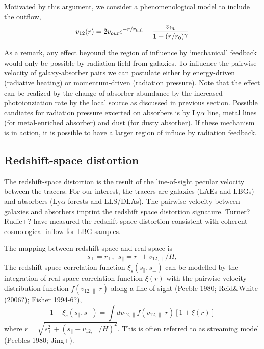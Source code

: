 \documentclass[useAMS,usenatbib,twocolumn]{mn2e}
\newcommand{\LyA}{\mbox{Ly}\alpha}
\begin{document}
Motivated by this argument, we consider a phenomenological model 
to include the outflow,
\begin{equation}
v_{12}(r)=2v_{out}e^{-r/r_{\rm{infl}}}-\frac{v_{in}}{1+(r/r_0)^\gamma}
\end{equation}

As a remark, any effect beyound the region of influence by `mechanical' 
feedback would only be possible by radiation field from galaxies. 
To influence the pairwise velocity of galaxy-absorber pairs we can
postulate either by energy-driven (radiative heating) or 
momentum-driven (radiation pressure). Note that the effect can be 
realized by the change of absorber abundance by the increased 
photoionziation rate by the local source as discussed in previous section.
Possible candiates for radiation pressure excerted on absorbers is
by $\LyA$ line, metal lines (for metal-enriched absorber) and dust 
(for dusty absorber). If these mechanism is in action, it is possible
to have a larger region of influce by radiation feedback.



\subsection{Redshift-space distortion}
The redshift-space distortion is the result of the line-of-sight pecular 
velocity between the tracers. For our interest, the tracers are galaxies 
(LAEs and LBGs) and absorbers ($\LyA$ forests and LLS/DLAs). 
The pairwise velocity between galaxies and absorbers imprint the redshift space
distortion signature. Turner? Rudie+? have measured the redshift space 
distortion consistent with coherent cosmological inflow for LBG samples. 

The mapping between redshift space and real space is
\begin{equation}
s_\perp=r_\perp,~~s_\parallel=r_\parallel+v_{12,\parallel}/H,
\end{equation}
The redshift-space correlation function $\xi_s(s_\parallel,s_\perp)$ can be 
modelled by the integration of real-space correlation function $\xi(r)$
with the pairwise velocity distribution function $f(v_{12,\parallel}|r)$ along a 
line-of-sight (Peeble 1980; Reid\&White (2006?); Fisher 1994-6?),
\begin{equation}
1+\xi_s(s_\parallel,s_\perp)=\int dv_{12,\parallel}f(v_{12,\parallel}|r)
\left[1+\xi(r)\right]
\end{equation}
where $r=\sqrt{s_\perp^2+(s_\parallel-v_{12,\parallel}/H)^2}$.
This is often referred to as streaming model (Peebles 1980; Jing+).
\end{document}
